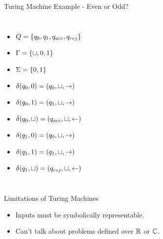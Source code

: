 \documentclass[c]{beamer}
\begin{document}
\begin{frame}{Turing Machine Example - Even or Odd?}
  \begin{columns}[c]
    
    \small


    \begin{itemize}
    \item[] $Q = \{q_0, q_1, q_{acc}, q_{rej}\}$
    \item[] $\Gamma = \{\sqcup, 0, 1\}$
    \item[] $\Sigma = \{0,1\}$
    \item[] $\delta(q_0, 0) = (q_0, \sqcup, \rightarrow)$
    \item[] $\delta(q_0, 1) = (q_1, \sqcup, \rightarrow)$
    \item[] $\delta(q_0, \sqcup) = (q_{acc}, \sqcup, \leftarrow)$
    \item[] $\delta(q_1, 0) = (q_0, \sqcup, \rightarrow)$
    \item[] $\delta(q_1, 1) = (q_1, \sqcup, \rightarrow)$
    \item[] $\delta(q_1, \sqcup) = (q_{rej}, \sqcup, \leftarrow)$
    \end{itemize}

    
      
  \end{columns}
\end{frame}

\begin{frame}{Limitations of Turing Machines}

  \begin{itemize}
  \item Inputs must be symbolically representable. \pause
  \item Can't talk about problems defined over $\mathbb{R}$ or
    $\mathbb{C}$.
  \end{itemize}
  
\end{frame}
\end{document}
